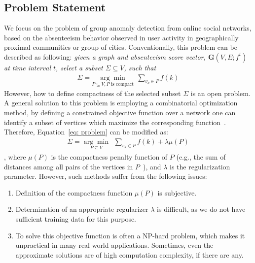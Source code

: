\documentclass[conference]{IEEEtran}
\begin{document}
\subsection{Problem Statement}
\label{sec:problemformulation}
We focus on the problem of group anomaly detection from online social networks, based on the absenteeism behavior observed in user activity in geographically proximal communities or group of cities.
Conventionally, this problem can be described as following: \emph{given a graph and \textit{absenteeism score} vector, $\mathbf{G}(V,E;f^t)$ at time interval $t$, select a subset $\Sigma \subseteq V$, such that
\begin{eqnarray}
 \label{eq: problem}
    \Sigma=\underset{P\subseteq V, P \mbox{ is compact}}{\arg\min}\ \ \sum_{v_k\in P} {f(k)}
\end{eqnarray} }
However, how to define compactness of the selected subset $\Sigma$ is an open problem.
A general solution to this problem is employing a combinatorial optimization method, by defining a constrained objective function over a network one can identify a subset of vertices which maximize the corresponding function~\cite{rozenshtein2014event}. Therefore, Equation~\ref{eq: problem} can be modified as:
\begin{eqnarray}
 \label{eq: problem_conventional}
    \Sigma=\underset{P\subseteq V}{\arg\min}\ \ \sum_{v_k\in P} {f(k)}+\lambda \mu(P)
\end{eqnarray}
, where $\mu(P)$ is the compactness penalty function of $P$ (e.g., the sum of distances among
all pairs of the vertices in $P$~\cite{rozenshtein2014event}), and $\lambda$ is the regularization parameter.
However, such methods suffer from the following issues:
\begin{enumerate}
\item Definition of the compactness function $\mu(P)$ is subjective.
\item  Determination of an appropriate regularizer $\lambda$ is difficult, as we do not have sufficient training data for this purpose.
\item To solve this objective function is often a NP-hard problem, which makes it unpractical in many real world applications. Sometimes, even the approximate solutions are of high computation complexity, if there are any.
\end{enumerate}
\end{document}
